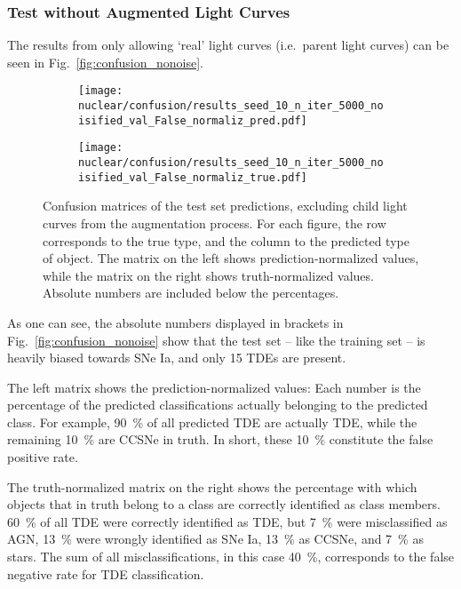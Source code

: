 \subsubsection{Test without Augmented Light Curves}
The results from only allowing `real' light curves (i.e.~parent light curves) can be seen in Fig.~\ref{fig:confusion_nonoise}.

\begin{figure}[htb]
  \centering
  \begin{subfigure}[b]{0.49\textwidth}
    \centering
    \texttt{[image: nuclear/confusion/results\_seed\_10\_n\_iter\_5000\_noisified\_val\_False\_normaliz\_pred.pdf]}
  \end{subfigure}
  \begin{subfigure}[b]{0.49\textwidth}
    \centering
    \texttt{[image: nuclear/confusion/results\_seed\_10\_n\_iter\_5000\_noisified\_val\_False\_normaliz\_true.pdf]}
  \end{subfigure}
  \caption[Confusion matrices without augmentation]{Confusion matrices of the test set predictions, excluding child light curves from the augmentation process. For each figure, the row corresponds to the true type, and the column to the predicted type of object. The matrix on the left shows prediction-normalized values, while the matrix on the right shows truth-normalized values. Absolute numbers are included below the percentages.}
\end{figure}

As one can see, the absolute numbers displayed in brackets in Fig.~\ref{fig:confusion_nonoise} show that the test set -- like the training set -- is heavily biased towards SNe Ia, and only 15 TDEs are present.

The left matrix shows the prediction-normalized values: Each number is the percentage of the predicted classifications actually belonging to the predicted class. For example, \SI{90}{\percent} of all predicted TDE are actually TDE, while the remaining \SI{10}{\percent} are CCSNe in truth. In short, these \SI{10}{\percent} constitute the false positive rate.

The truth-normalized matrix on the right shows the percentage with which objects that in truth belong to a class are correctly identified as class members. \SI{60}{\percent} of all TDE were correctly identified as TDE, but \SI{7}{\percent} were misclassified as AGN, \SI{13}{\percent} were wrongly identified as SNe Ia, \SI{13}{\percent} as CCSNe, and \SI{7}{\percent} as stars. The sum of all misclassifications, in this case \SI{40}{\percent}, corresponds to the false negative rate for TDE classification.

